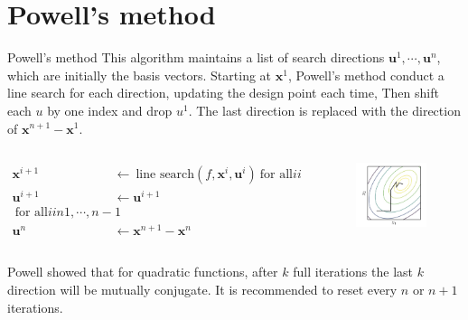 \documentclass{beamer}
\begin{document}
\section{Powell's method}
\begin{frame}{Powell's method}
This algorithm maintains a list of search directions $\boldsymbol{u}^1, \cdots, \boldsymbol{u}^n$, which are initially the basis vectors.
Starting at $\boldsymbol{x}^1$, Powell's method conduct a line search for each direction, updating the design point each time,
Then shift each $u$ by one index and drop $u^1$.
The last direction is replaced with the direction of $\boldsymbol{x}^{n+1} - \boldsymbol{x}^1$.


\begin{columns}
\begin{column}{.7\textwidth}
\begin{equation*}
\begin{split}
		\boldsymbol{x}^{i+1} &\leftarrow ~{\textrm{line search}} (f, \boldsymbol{x}^i, \boldsymbol{u}^i) ~{\textrm{for all}} i in 1, \cdots, n\\
		\boldsymbol{u}^{i+1} &\leftarrow \boldsymbol{u}^{i+1} \\~ {\textrm{for all}} i in 1, \cdots, n-1\\
    \boldsymbol{u}^{n} &\leftarrow \boldsymbol{x}^{n+1} - \boldsymbol{x}^n    
\end{split}
\end{equation*}
\end{column}

\begin{column}{.3\textwidth}
\begin{figure}
\centering
\includegraphics[width=30mm]{Figs/powell.jpeg}
\end{figure} 
\end{column}

\end{columns}

Powell showed that for quadratic functions, after $k$ full iterations the last $k$ direction will be mutually conjugate.
It is recommended to reset every $n$ or $n+1$ iterations.

\end{frame}
\end{document}
